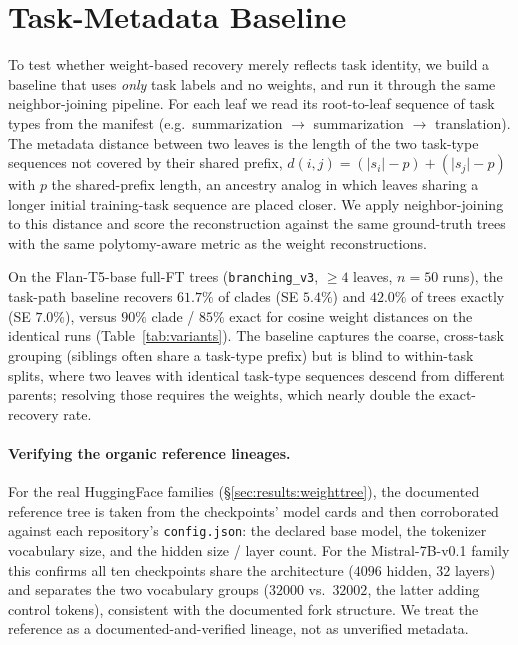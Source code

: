 \documentclass{article}
\theoremstyle{definition}
\theoremstyle{plain}
\begin{document}
\section{Task-Metadata Baseline}
\label{app:taskbaseline}

To test whether weight-based recovery merely reflects task identity, we build a baseline that uses
\emph{only} task labels and no weights, and run it through the same neighbor-joining pipeline. For each
leaf we read its root-to-leaf sequence of task types from the manifest (e.g.\ summarization $\to$
summarization $\to$ translation). The metadata distance between two leaves is the length of the two
task-type sequences not covered by their shared prefix, $d(i,j)=(\lvert s_i\rvert-p)+(\lvert
s_j\rvert-p)$ with $p$ the shared-prefix length, an ancestry analog in which leaves sharing a longer
initial training-task sequence are placed closer. We apply neighbor-joining to this distance and score
the reconstruction against the same ground-truth trees with the same polytomy-aware metric as the
weight reconstructions.

On the Flan-T5-base full-FT trees (\texttt{branching\_v3}, $\geq 4$ leaves, $n=50$ runs), the task-path
baseline recovers $61.7\%$ of clades (SE $5.4\%$) and $42.0\%$ of trees exactly (SE $7.0\%$), versus
$90\%$ clade / $85\%$ exact for cosine weight distances on the identical runs
(Table~\ref{tab:variants}). The baseline captures the coarse, cross-task grouping (siblings often
share a task-type prefix) but is blind to within-task splits, where two leaves with identical
task-type sequences descend from different parents; resolving those requires the weights, which nearly
double the exact-recovery rate.

\paragraph{Verifying the organic reference lineages.} For the real HuggingFace families
(\S\ref{sec:results:weighttree}), the documented reference tree is taken from the checkpoints' model cards and
then corroborated against each repository's \texttt{config.json}: the declared base model, the tokenizer
vocabulary size, and the hidden size / layer count. For the Mistral-7B-v0.1 family this confirms all ten
checkpoints share the architecture ($4096$ hidden, $32$ layers) and separates the two vocabulary groups
($32000$ vs.\ $32002$, the latter adding control tokens), consistent with the documented fork structure.
We treat the reference as a documented-and-verified lineage, not as unverified metadata.
\end{document}
